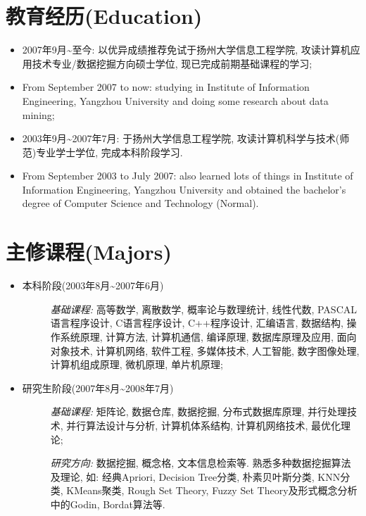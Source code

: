 \documentclass[a4paper,10pt,english]{manual}
\begin{document}
\section{教育经历(Education)}
\begin{itemize}
\item {} 
2007年9月\textasciitilde{}至今: 以优异成绩推荐免试于扬州大学信息工程学院, 攻读计算机应用技术专业/数据挖掘方向硕士学位, 现已完成前期基础课程的学习;

\item {} 
From September 2007 to now: studying in Institute of Information Engineering, Yangzhou University and doing some research about data mining;

\item {} 
2003年9月\textasciitilde{}2007年7月: 于扬州大学信息工程学院, 攻读计算机科学与技术(师范)专业学士学位, 完成本科阶段学习.

\item {} 
From September 2003 to July 2007: also learned lots of things in Institute of Information Engineering, Yangzhou University and obtained the bachelor's degree of Computer Science and Technology (Normal).

\end{itemize}


\section{主修课程(Majors)}
\begin{itemize}
\item {} \begin{description}
\item[本科阶段(2003年8月\textasciitilde{}2007年6月)]
\emph{基础课程:} 高等数学, 离散数学, 概率论与数理统计, 线性代数, PASCAL语言程序设计, C语言程序设计, C++程序设计, 汇编语言, 数据结构, 操作系统原理, 计算方法, 计算机通信, 编译原理, 数据库原理及应用, 面向对象技术, 计算机网络, 软件工程, 多媒体技术, 人工智能, 数字图像处理, 计算机组成原理, 微机原理, 单片机原理;

\end{description}

\item {} \begin{description}
\item[研究生阶段(2007年8月\textasciitilde{}2008年7月)]
\emph{基础课程:} 矩阵论, 数据仓库, 数据挖掘, 分布式数据库原理, 并行处理技术, 并行算法设计与分析, 计算机体系结构, 计算机网络技术, 最优化理论;

\emph{研究方向:} 数据挖掘, 概念格, 文本信息检索等. 熟悉多种数据挖掘算法及理论, 如: 经典Apriori, Decision Tree分类, 朴素贝叶斯分类, KNN分类, KMeans聚类, Rough Set Theory, Fuzzy Set Theory及形式概念分析中的Godin, Bordat算法等.

\end{description}

\end{itemize}
\end{document}
